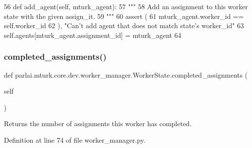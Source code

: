 \begin{DoxyCode}
56     \textcolor{keyword}{def }add\_agent(self, mturk\_agent):
57         \textcolor{stringliteral}{"""}
58 \textcolor{stringliteral}{        Add an assignment to this worker state with the given assign\_it.}
59 \textcolor{stringliteral}{        """}
60         \textcolor{keyword}{assert} (
61             mturk\_agent.worker\_id == self.worker\_id
62         ), \textcolor{stringliteral}{"Can't add agent that does not match state's worker\_id"}
63         self.agents[mturk\_agent.assignment\_id] = mturk\_agent
64 
\end{DoxyCode}
\mbox{\label{classparlai_1_1mturk_1_1core_1_1dev_1_1worker__manager_1_1WorkerState_af8edaccdc36152c54f0a4083edcad3b3}} 
\subsubsection{\texorpdfstring{completed\+\_\+assignments()}{completed\_assignments()}}
{\footnotesize\ttfamily def parlai.\+mturk.\+core.\+dev.\+worker\+\_\+manager.\+Worker\+State.\+completed\+\_\+assignments (\begin{DoxyParamCaption}\item[{}]{self }\end{DoxyParamCaption})}

\begin{DoxyVerb}Returns the number of assignments this worker has completed.
\end{DoxyVerb}
 

Definition at line 74 of file worker\+\_\+manager.\+py.


